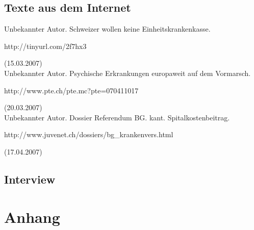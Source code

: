 \documentclass[a4paper,12pt]{book}
\begin{document}
\section{Texte aus dem Internet}
Unbekannter Autor. Schweizer wollen keine Einheitskrankenkasse.\newline \begin{small}http://tinyurl.com/2f7hx3                       \end{small}(15.03.2007)\newline\\
Unbekannter Autor. Psychische Erkrankungen europaweit auf dem Vormarsch.\newline
\begin{small}
 http://www.pte.ch/pte.mc?pte=070411017
\end{small} (20.03.2007)\newline\\
Unbekannter Autor. Dossier Referendum BG. kant. Spitalkostenbeitrag.\newline
\begin{small}
http://www.juvenet.ch/dossiers/bg\_krankenvers.html
\end{small} (17.04.2007) \newline\\

\section{Interview}

\chapter{Anhang}
\end{document}
